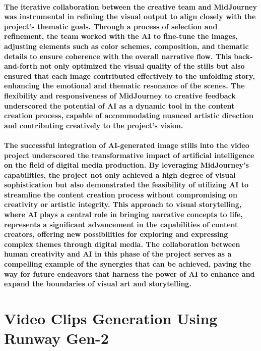 \documentclass[11pt,a4paper,oneside]{report}
\begin{document}
\paragraph{The iterative collaboration between the creative team and MidJourney was instrumental in refining the visual output to align closely with the project's thematic goals. Through a process of selection and refinement, the team worked with the AI to fine-tune the images, adjusting elements such as color schemes, composition, and thematic details to ensure coherence with the overall narrative flow. This back-and-forth not only optimized the visual quality of the stills but also ensured that each image contributed effectively to the unfolding story, enhancing the emotional and thematic resonance of the scenes. The flexibility and responsiveness of MidJourney to creative feedback underscored the potential of AI as a dynamic tool in the content creation process, capable of accommodating nuanced artistic direction and contributing creatively to the project's vision.}

\paragraph{The successful integration of AI-generated image stills into the video project underscored the transformative impact of artificial intelligence on the field of digital media production. By leveraging MidJourney's capabilities, the project not only achieved a high degree of visual sophistication but also demonstrated the feasibility of utilizing AI to streamline the content creation process without compromising on creativity or artistic integrity. This approach to visual storytelling, where AI plays a central role in bringing narrative concepts to life, represents a significant advancement in the capabilities of content creators, offering new possibilities for exploring and expressing complex themes through digital media. The collaboration between human creativity and AI in this phase of the project serves as a compelling example of the synergies that can be achieved, paving the way for future endeavors that harness the power of AI to enhance and expand the boundaries of visual art and storytelling.}

\section{Video Clips Generation Using Runway Gen-2}
\end{document}
